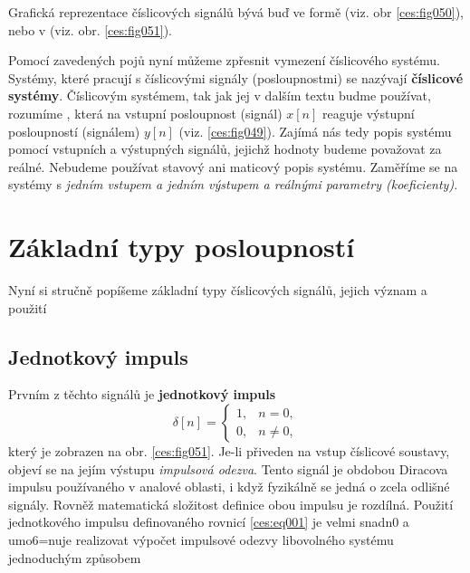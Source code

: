     Grafická reprezentace číslicových signálů bývá buď ve  formě (viz. obr
    \ref{ces:fig050}), nebo v  (viz. obr. \ref{ces:fig051}).

  

    Pomocí zavedených pojů nyní můžeme zpřesnit vymezení číslicového systému. Systémy, které pracují
    s číslicovými signály (posloupnostmi) se nazývají \textbf{číslicové systémy}. Číslicovým
    systémem, tak jak jej v dalším textu budme používat, rozumíme , která na
    vstupní posloupnost (signál) \(x[n]\) reaguje výstupní posloupností (signálem) \(y[n]\) (viz.
    \ref{ces:fig049}). Zajímá nás tedy popis systému pomocí vstupních a výstupných signálů, jejichž
    hodnoty budeme považovat za reálné. Nebudeme používat stavový ani maticový popis systému.
    Zaměříme se na systémy s \emph{jedním vstupem a jedním výstupem a reálnými parametry
    (koeficienty)}.
    

  \section{Základní typy posloupností}\label{ces:IchapIsecII}
    Nyní si stručně popíšeme základní typy číslicových signálů, jejich význam a použití

    \subsection{Jednotkový impuls}
      Prvním z těchto signálů je \textbf{jednotkový impuls}
      \begin{equation}\label{ces:eq001}
        \delta[n]=
        \begin{cases} 
            1, &  n = 0, \\
             0, &  n \neq 0,
        \end{cases}
      \end{equation}
      který je zobrazen na obr. \ref{ces:fig051}. Je-li přiveden na vstup číslicové soustavy,
      objeví se na jejím výstupu \emph{impulsová odezva}. Tento signál je obdobou Diracova
      impulsu používaného v analové oblasti, i když fyzikálně se jedná o zcela odlišné
      signály. Rovněž matematická složitost definice obou impulsu je rozdílná. Použití
      jednotkového impulsu definovaného rovnicí \ref{ces:eq001} je velmi snadn0 a umo6=nuje
      realizovat výpočet impulsové odezvy libovolného systému jednoduchým způsobem
            
